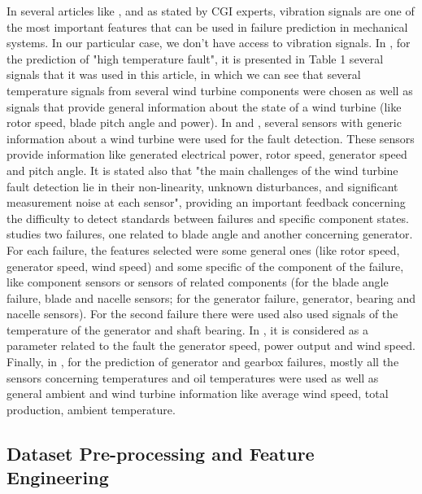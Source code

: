In several articles like \cite{N_1_WIND} \cite{N_5_WIND}, and as stated by CGI experts, vibration signals are one of the most important features that can be used in failure prediction in mechanical systems. In our particular case, we don't have access to vibration signals.
In \cite{OLD_19_WIND}, for the prediction of "high temperature fault", it is presented in Table 1 several signals that it was used in this article, in which we can see that several temperature signals from several wind turbine components were chosen as well as signals that provide general information about the state of a wind turbine (like rotor speed, blade pitch angle and power).
In \cite{N_2_WIND} and \cite{39_WIND}, several sensors with generic information about a wind turbine were used for the fault detection. These sensors provide information like generated electrical power, rotor speed, generator speed and pitch angle. It is stated also that "the main challenges of the wind turbine fault detection lie in their non-linearity, unknown disturbances, and significant measurement noise at each sensor", providing an important feedback concerning the difficulty to detect standards between failures and specific component states.
\cite{N_3_WIND} studies two failures, one related to blade angle and another concerning generator. For each failure, the features selected were some general ones (like rotor speed, generator speed, wind speed) and some specific of the component of the failure, like component sensors or sensors of related components (for the blade angle failure, blade and nacelle sensors; for the generator failure, generator, bearing and nacelle sensors). For the second failure there were used also used signals of the temperature of the generator and shaft bearing.
In \cite{OLD_41_WIND}, it is considered as a parameter related to the fault the generator speed, power output and wind speed.
Finally, in \cite{N_8_WIND}, for the prediction of generator and gearbox failures, mostly all the sensors concerning temperatures and oil temperatures were used as well as general ambient and wind turbine information like average wind speed, total production, ambient temperature.


\subsection{Dataset Pre-processing and Feature Engineering}

